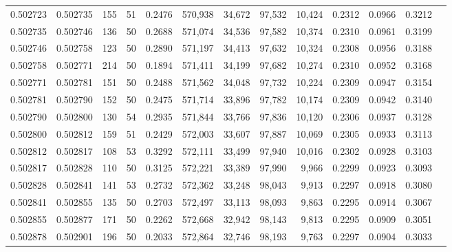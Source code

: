 \begin{tabular}{rrrrrrrrrrrrr}
0.502723 & 0.502735 & 155 &  51 &                                     0.2476 & 570,938 &  34,672 &  97,532 &  10,424 & 0.2312 & 0.0966 & 0.3212 \\
0.502735 & 0.502746 & 136 &  50 &                                     0.2688 & 571,074 &  34,536 &  97,582 &  10,374 & 0.2310 & 0.0961 & 0.3199 \\
0.502746 & 0.502758 & 123 &  50 &                                     0.2890 & 571,197 &  34,413 &  97,632 &  10,324 & 0.2308 & 0.0956 & 0.3188 \\
0.502758 & 0.502771 & 214 &  50 &                                     0.1894 & 571,411 &  34,199 &  97,682 &  10,274 & 0.2310 & 0.0952 & 0.3168 \\
0.502771 & 0.502781 & 151 &  50 &                                     0.2488 & 571,562 &  34,048 &  97,732 &  10,224 & 0.2309 & 0.0947 & 0.3154 \\
0.502781 & 0.502790 & 152 &  50 &                                     0.2475 & 571,714 &  33,896 &  97,782 &  10,174 & 0.2309 & 0.0942 & 0.3140 \\
0.502790 & 0.502800 & 130 &  54 &                                     0.2935 & 571,844 &  33,766 &  97,836 &  10,120 & 0.2306 & 0.0937 & 0.3128 \\
0.502800 & 0.502812 & 159 &  51 &                                     0.2429 & 572,003 &  33,607 &  97,887 &  10,069 & 0.2305 & 0.0933 & 0.3113 \\
0.502812 & 0.502817 & 108 &  53 &                                     0.3292 & 572,111 &  33,499 &  97,940 &  10,016 & 0.2302 & 0.0928 & 0.3103 \\
0.502817 & 0.502828 & 110 &  50 &                                     0.3125 & 572,221 &  33,389 &  97,990 &   9,966 & 0.2299 & 0.0923 & 0.3093 \\
0.502828 & 0.502841 & 141 &  53 &                                     0.2732 & 572,362 &  33,248 &  98,043 &   9,913 & 0.2297 & 0.0918 & 0.3080 \\
0.502841 & 0.502855 & 135 &  50 &                                     0.2703 & 572,497 &  33,113 &  98,093 &   9,863 & 0.2295 & 0.0914 & 0.3067 \\
0.502855 & 0.502877 & 171 &  50 &                                     0.2262 & 572,668 &  32,942 &  98,143 &   9,813 & 0.2295 & 0.0909 & 0.3051 \\
0.502878 & 0.502901 & 196 &  50 &                                     0.2033 & 572,864 &  32,746 &  98,193 &   9,763 & 0.2297 & 0.0904 & 0.3033 \\

\end{tabular}
